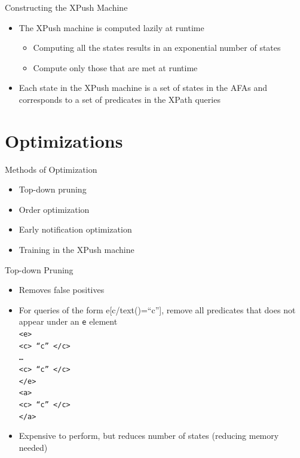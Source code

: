 \documentclass[mathserif,serif]{beamer}
\begin{document}
\begin{frame}{Constructing the XPush Machine}
  \begin{itemize}
    \item The XPush machine is computed lazily at runtime
    \begin{itemize}
      \item Computing all the states results in an exponential number of states
      \item Compute only those that are met at runtime
    \end{itemize}
    \item Each state in the XPush machine is a set of states in the AFAs and corresponds to a set of predicates in the XPath queries 
  \end{itemize}
\end{frame}

\section{Optimizations}
\begin{frame}{Methods of Optimization}
  \begin{itemize}
    \item Top-down pruning
    \item Order optimization
    \item Early notification optimization
    \item Training in the XPush machine
  \end{itemize}
\end{frame}

\begin{frame}{Top-down Pruning}
  \begin{itemize}
    \item Removes false positives
    \item For queries of the form e[c/text()=``c''], remove all predicates that does not appear under an \texttt{e} element\\ 
    \texttt{<e> \\
            \quad <c> ``c'' </c> \\
            \quad \dots \\
            \quad <c> ``c'' </c>\\ 
            </e>\\
            <a> \\
            \quad <c> ``c'' </c> \\
            </a>}
    \item Expensive to perform, but reduces number of states (reducing memory needed)
  \end{itemize}
\end{frame}
\end{document}
